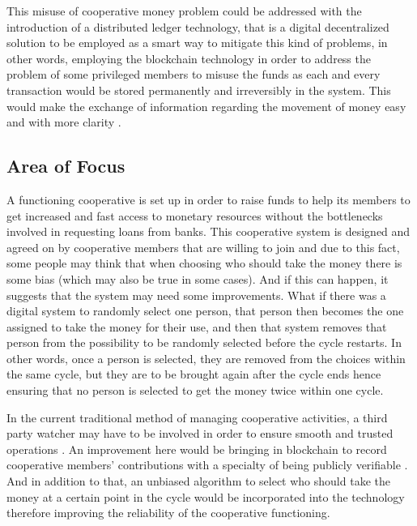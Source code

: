 \documentclass{article}
\begin{document}
\begin{flushleft}
This misuse of cooperative money problem could be addressed with the introduction of a distributed ledger technology, that is a digital decentralized solution to be employed as a smart way to mitigate this kind of problems, in other words, employing the blockchain technology in order to address the problem of some privileged members to misuse the funds as each and every transaction would be stored permanently and irreversibly in the system. This would make the exchange of information regarding the movement of money easy and with more clarity \cite{rodrigues2019evaluating}.

\subsection{Area of Focus}
A functioning cooperative is set up in order to raise funds to help its members to get increased and fast access to monetary resources without the bottlenecks involved in requesting loans from banks. This cooperative system is designed and agreed on by cooperative members that are willing to join and due to this fact, some people may think that when choosing who should take the money there is some bias (which may also be true in some cases). And if this can happen, it suggests that the system may need some improvements. What if there was a digital system to randomly select one person, that person then becomes the one assigned to take the money for their use, and then that system removes that person from the possibility to be randomly selected before the cycle restarts. In other words, once a person is selected, they are removed from the choices within the same cycle, but they are to be brought again after the cycle ends hence ensuring that no person is selected to get the money twice within one cycle.

In the current traditional method of managing cooperative activities, a third party watcher may have to be involved in order to ensure smooth and trusted operations \cite{nair2018blockchain}. An improvement here would be bringing in blockchain to record cooperative members’ contributions with a specialty of being publicly verifiable \cite{nair2018blockchain}. And in addition to that, an unbiased algorithm to select who should take the money at a certain point in the cycle would be incorporated into the technology therefore improving the reliability of the cooperative functioning. 


\end{flushleft}
\end{document}
